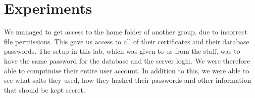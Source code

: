 \section{Experiments}
\label{sec:experiments}

We managed to get access to the home folder of another group, due to incorrect file permissions.
This gave us access to all of their certificates and their database passwords.
The setup in this lab, which was given to us from the staff, was to have the same password for the database and the server login.
We were therefore able to comprimise their entire user account.
In addition to this, we were able to see what salts they used, how they hashed their passwords and other information that should be kept secret.
